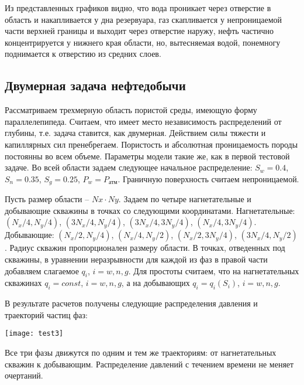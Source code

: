 Из представленных графиков видно, что вода проникает через отверстие в область и накапливается 
у дна резервуара, газ скапливается у непроницаемой части верхней границы и выходит через отверстие 
наружу, нефть частично концентрируется у нижнего края области, но, вытесняемая водой,
 понемногу поднимается к отверстию из средних слоев.  

\subsection{Двумерная задача нефтедобычи}
Рассматриваем трехмерную область пористой среды, имеющую форму параллелепипеда. Считаем,
что имеет место независимость распределений от глубины, т.е. задача ставится, как двумерная. 
Действием силы тяжести и капиллярных сил пренебрегаем. Пористость и
абсолютная проницаемость породы постоянны во всем объеме. Параметры модели такие же, как
в первой тестовой задаче. Во всей области задаем следующее 
начальное распределение: $S_w=0.4$,\; $S_n=0.35$,\; $S_g=0.25$, 
$P_w=P_\text{атм}$. Граничную поверхность считаем непроницаемой.

Пусть размер области -- $Nx\cdot Ny$.
Задаем по четыре нагнетательные и добывающие скважины в точках со следующими координатами.
Нагнетательные: $(N_x/4, N_y/4)$, $(3N_x/4, N_y/4)$, $(3N_x/4, 3N_y/4)$, $(N_x/4, 3N_y/4)$.
Добывающие: $(N_x/2, N_y/4)$, $(N_x/4, N_y/2)$, $(N_x/2, 3N_y/4)$, $(3N_x/4, N_y/2)$.
Радиус скважин пропорционален размеру области.
В точках, отведенных под скважины, в уравнении неразрывности для каждой из фаз 
в правой части добавляем слагаемое $q_i$,\; $i=w,n,g$.
Для простоты считаем, что на нагнетательных скважинах $q_i=const$,\; $i=w,n,g$, 
а на добывающих $q_i=q_i(S_i)$,\; $i=w,n,g$.

В результате расчетов получены следующие распределения давления и траекторий частиц фаз:
\begin{center}
 \texttt{[image: test3]}
\end{center}
Все три фазы движутся по одним и тем же траекториям: от нагнетательных скважин к 
добывающим. Распределение давлений с течением времени не меняет очертаний.
